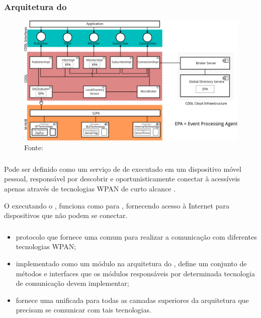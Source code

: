 \documentclass[aspectratio=169]{beamer}
\begin{document}
\begin{frame}
	\frametitle{Arquitetura do \mhubcddl}
	\begin{figure}
		\centering
		\includegraphics[width=.72\linewidth]{img/mhub-cddl-architecture.png}
		\caption{Fonte: \cite{gomes:et-al:2017}}
	\end{figure}
\end{frame}

\begin{frame}
	\frametitle{\mhub}
	Pode ser definido como um serviço de \middleware de \iomt executado em um dispositivo móvel pessoal, responsável por descobrir e oportunisticamente conectar à \smartobjs acessíveis apenas através de tecnologias WPAN de curto alcance \cite{talavera:et-al:2015}.

	\bigskip
	
	O \smartphone executando o \mhub, funciona como \gateway para \smartobjs, fornecendo acesso à Internet para dispositivos que não podem se conectar.
\end{frame}

\begin{frame}
	\frametitle{\stwopa}
	\begin{itemize}
		\item protocolo que fornece uma \api comum para realizar a comunicação com diferentes tecnologias WPAN;
			
		\item implementado como um módulo na arquitetura do \middleware, define um conjunto de métodos e interfaces que os módulos responsáveis por determinada tecnologia de comunicação devem implementar;
			
		\item fornece uma \api unificada para todas as camadas superiores da arquitetura que precisam se comunicar com tais tecnologias.
			
	\end{itemize}
	
\end{frame}
\end{document}
